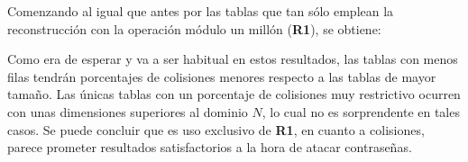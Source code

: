 \documentclass[12pt,spanish,listoffigures,listoftables,listofalgorithms]{tfgetsinf}
\begin{document}
Comenzando al igual que antes por las tablas que tan sólo emplean la reconstrucción con la operación módulo un millón (\textbf{R1}), se obtiene:

\def\arraystretch{1.5}
\begin{table}[H]
	\centering
	\caption{Porcentajes de colisiones para las tablas empleando \textbf{R1}}
	\label{colR1}
\end{table}

Como era de esperar y va a ser habitual en estos resultados, las tablas con menos filas tendrán porcentajes de colisiones menores respecto a las tablas de mayor tamaño. Las únicas tablas con un porcentaje de colisiones muy restrictivo ocurren con unas dimensiones superiores al dominio $N$, lo cual no es sorprendente en tales casos. Se puede concluir que es uso exclusivo de \textbf{R1}, en cuanto a colisiones, parece prometer resultados satisfactorios a la hora de atacar contraseñas.
\end{document}
